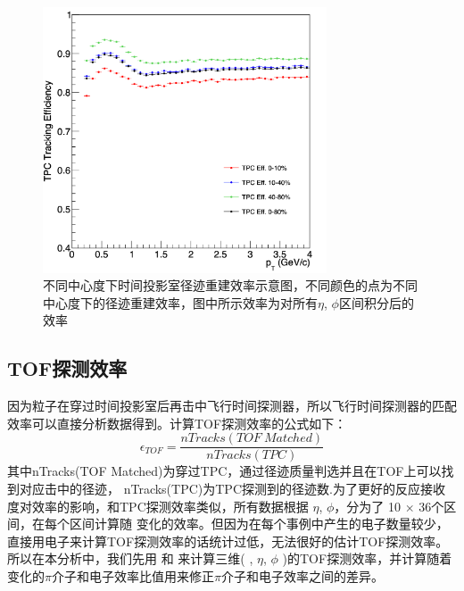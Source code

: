 \begin{figure}[htb]
    \begin{center}
    \includegraphics[width=0.75\textwidth,clip]{figures/Chapter4/TPCTracking.png}
    \end{center}
    \caption[不同中心度下时间投影室径迹重建效率示意图]{不同中心度下时间投影室径迹重建效率示意图，不同颜色的点为不同中心度下的径迹重建效率，图中所示效率为对所有$\eta$, $\phi$区间积分后的效率}
    \label{fig:TPCTracking}
\end{figure}

\subsection{TOF探测效率}
因为粒子在穿过时间投影室后再击中飞行时间探测器，所以飞行时间探测器的匹配效率可以直接分析数据得到。计算TOF探测效率的公式如下：
\begin{equation}
    \epsilon_{TOF} = \frac{ nTracks(TOF~Matched) }{ nTracks(TPC) }
\end{equation}
其中nTracks(TOF Matched)为穿过TPC，通过径迹质量判选并且在TOF上可以找到对应击中的径迹， nTracks(TPC)为TPC探测到的径迹数.为了更好的反应接收度对效率的影响，和TPC探测效率类似，所有数据根据 $\eta$, $\phi$，分为了 10 $\times$ 36个区间，在每个区间计算随 \pt 变化的效率。但因为在每个事例中产生的电子数量较少，直接用电子来计算TOF探测效率的话统计过低，无法很好的估计TOF探测效率。所以在本分析中，我们先用 \piplus 和 \piminus 来计算三维( \pt , $\eta$, $\phi$ )的TOF探测效率，并计算随着 \pt 变化的$\pi$介子和电子效率比值用来修正$\pi$介子和电子效率之间的差异。

